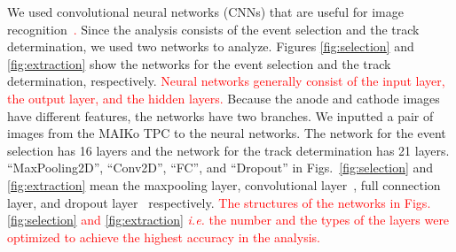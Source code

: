 \documentclass{jps-cp}
\begin{document}
We used convolutional neural networks (CNNs) that are useful for image recognition~\cite{lenet,alexnet}\textcolor{red}{.}
Since the analysis consists of the event selection and the track determination,
we used two networks to analyze.
Figures \ref{fig:selection} and \ref{fig:extraction} show
the networks for the event selection and the track determination, respectively.
\textcolor{red}{Neural networks generally consist of the input layer, the output layer, and the hidden layers.}
Because the anode and cathode images have different features,
the networks have two branches.
We inputted a pair of images from the MAIKo TPC to the neural networks.
The network for the event selection has 16 layers and the network for the track determination has 21 layers.
``MaxPooling2D'', ``Conv2D'', ``FC'', and ``Dropout'' in Figs.~\ref{fig:selection} and \ref{fig:extraction}
mean the maxpooling layer, convolutional layer~\textcolor{red}{\cite{conv}}, full connection layer, and dropout layer~\textcolor{red}{\cite{dropout}} respectively.
\textcolor{red}{The structures of the networks in Figs. \ref{fig:selection} and \ref{fig:extraction} {\it i.e.}
  the number and the types of the layers were
  optimized to achieve the highest accuracy in the analysis.}
\end{document}
